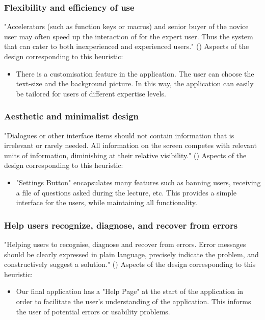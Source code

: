 \documentclass{article}
\begin{document}
\subsubsection{Flexibility and efficiency of use\label{7thheuristic}}
"Accelerators (such as function keys or macros) and senior buyer of the novice user may often speed up the interaction of for the expert user. Thus the system that can cater to both inexperienced and experienced users." (\textcite{Nielsen1994})
Aspects of the design corresponding to this heuristic:
\begin{itemize}
\item There is a customisation feature in the application. The user can choose the text-size and the background picture. In this way, the application can easily be tailored for users of different expertise levels. 
\end{itemize}

\subsubsection{Aesthetic and minimalist design\label{8thheuristic}}
"Dialogues or other interface items should not contain information that is irrelevant or rarely needed. All information on the screen competes with relevant units of information, diminishing at their relative visibility." (\textcite{Nielsen1994})
Aspects of the design corresponding to this heuristic:
\begin{itemize}
\item "Settings Button" encapsulates many features such as banning users, receiving a file of questions asked during the lecture, etc. This provides a simple interface for the users, while maintaining all functionality. 
\end{itemize}

\subsubsection{Help users recognize, diagnose, and recover from errors\label{9thheuristic}}
"Helping users to recognise, diagnose and recover from errors. Error messages should be clearly expressed in plain language, precisely indicate the problem, and constructively suggest a solution." (\textcite{Nielsen1994})
Aspects of the design corresponding to this heuristic:
\begin{itemize}
\item Our final application has a "Help Page" at the start of the application in order to facilitate the user's understanding of the application. This informs the user of potential errors or usability problems. 
\end{itemize}
\end{document}
